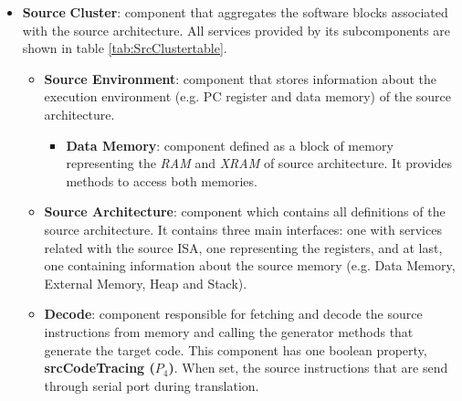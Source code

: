 \begin{itemize}
\item \textbf{Source} \textbf{Cluster}: component that aggregates the software blocks associated with the source architecture. All services provided by its subcomponents are shown in table \ref{tab:SrcClustertable}.

\begin{itemize}
\item \textbf{Source Environment}: component that stores information about the execution environment (e.g. PC register and data memory) of the source architecture.
\begin{itemize}
\item \textbf{Data Memory}: component defined as a block of memory representing the \textit{RAM} and \textit{XRAM} of source architecture. It provides methods to access both memories.
\end{itemize}

\item \textbf{Source Architecture}: component which contains all definitions of the source architecture. It contains three main interfaces: one with services related with the source ISA, one representing the registers, and at last, one containing information about the source memory (e.g. Data Memory, External Memory, Heap and Stack). 

\item \textbf{Decode}: component responsible for fetching and decode the source instructions from memory and calling the generator methods that generate the target code. This component has one boolean property, \textbf{srcCodeTracing ($P_4$)}. When set, the source instructions that are send through serial port during translation.


\end{itemize}
\end{itemize}
